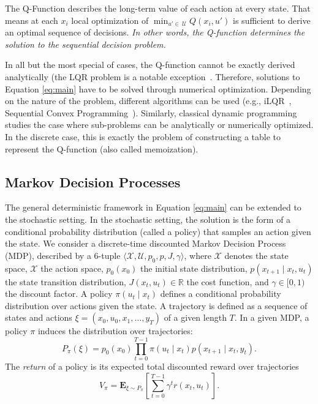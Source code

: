 The Q-Function describes the long-term value of each action at every state. 
That means at each $x_i$ local optimization of $\min_{u' \in ~ \mathcal{U} } Q(x_i,u')$ is sufficient to derive an optimal sequence of decisions. \emph{In other words, the Q-function determines the solution to the sequential decision problem.} 

In all but the most special of cases, the Q-function cannot be exactly derived analytically (the LQR problem is a notable exception~\cite{kalman1960contributions}. Therefore, solutions to Equation \ref{eq:main} have to be solved through numerical optimization.
Depending on the nature of the problem, different algorithms can be used (e.g., iLQR~\cite{li2004iterative}, Sequential Convex Programming~\cite{augugliaro2012generation}). Similarly, classical dynamic programming studies the case where sub-problems can be analytically or numerically optimized. In the discrete case, this is exactly the problem of constructing a table to represent the Q-function (also called memoization).

\subsection*{Markov Decision Processes}
The general deterministic framework in Equation \ref{eq:main} can be extended to the stochastic setting.
In the stochastic setting, the solution is the form of a conditional probability distribution (called a policy) that samples an action given the state.
We consider a discrete-time discounted Markov Decision Process (MDP), described by a 6-tuple $\langle \mathcal{X}, \mathcal{U}, p_0, p, J, \gamma \rangle$, where $\mathcal{X}$ denotes the state space, $\mathcal{X}$ the action space, $p_0(x_0)$ the initial state distribution, $p(x_{t+1} \mid x_{t}, u_{t})$ the state transition distribution, $J(x_t, u_t) \in \mathbb{R}$ the cost function, and $\gamma \in [0,1)$ the discount factor. A policy $\pi(u_t \mid x_t)$ defines a conditional probability distribution over actions given the state. A trajectory is defined as a sequence of states and actions $\xi = (x_0, u_0, x_1, \ldots, y_T)$ of a given length $T$. In a given MDP, a policy $\pi$ induces the distribution over trajectories:
\[
P_\pi(\xi) = p_0(x_0) \prod_{t=0}^{T-1} \pi(u_t \mid x_t) p(x_{t+1} \mid x_{t}, y_{t}).
\]
The \emph{return} of a policy is its expected total discounted reward over trajectories
\[
V_\pi = \mathbf{E}_{\xi \sim P_\pi}\left[\sum_{t=0}^{T-1} \gamma^t r(x_t,u_t)\right].
\]



